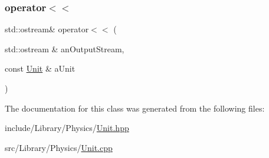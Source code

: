 \subsubsection{\texorpdfstring{operator$<$$<$}{operator<<}}
{\footnotesize\ttfamily std\+::ostream\& operator$<$$<$ (\begin{DoxyParamCaption}\item[{std\+::ostream \&}]{an\+Output\+Stream,  }\item[{const \hyperlink{classlibrary_1_1physics_1_1_unit}{Unit} \&}]{a\+Unit }\end{DoxyParamCaption})\hspace{0.3cm}{\ttfamily [friend]}}



The documentation for this class was generated from the following files\+:\begin{DoxyCompactItemize}
\item 
include/\+Library/\+Physics/\hyperlink{_unit_8hpp}{Unit.\+hpp}\item 
src/\+Library/\+Physics/\hyperlink{_unit_8cpp}{Unit.\+cpp}\end{DoxyCompactItemize}
